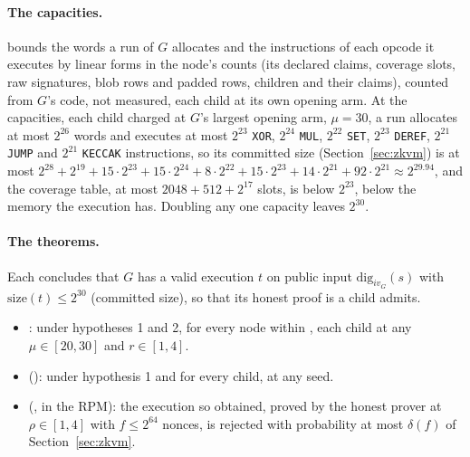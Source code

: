 \documentclass[11pt]{article}
\begin{document}
\paragraph{The capacities.}  bounds the words a run of $G$ allocates and the instructions of each opcode it executes by linear forms in the node's counts (its declared claims, coverage slots, raw signatures, blob rows and padded rows, children and their claims), counted from $G$'s code, not measured, each child at its own opening arm. At the capacities, each child charged at $G$'s largest opening arm, $\mu = 30$, a run allocates at most $2^{26}$ words and executes at most $2^{23}$ \texttt{XOR}, $2^{24}$ \texttt{MUL}, $2^{22}$ \texttt{SET}, $2^{23}$ \texttt{DEREF}, $2^{21}$ \texttt{JUMP} and $2^{21}$ \texttt{KECCAK} instructions, so its committed size (Section~\ref{sec:zkvm}) is at most $2^{28} + 2^{19} + 15 \cdot 2^{23} + 15 \cdot 2^{24} + 8 \cdot 2^{22} + 15 \cdot 2^{23} + 14 \cdot 2^{21} + 92 \cdot 2^{21} \approx 2^{29.94}$, and the coverage table, at most $2048 + 512 + 2^{17}$ slots, is below $2^{23}$, below the memory the execution has. Doubling any one capacity leaves $2^{30}$.

\paragraph{The theorems.} Each concludes that $G$ has a valid execution $t$ on public input
$\mathrm{dig}_{iv_G}(s)$ with $\mathrm{size}(t) \le 2^{30}$ (committed size), so that its honest
proof is a child  admits.
\begin{itemize}
\item {}: under hypotheses 1 and 2, for every node within , each child at any $\mu \in [20,30]$ and $r \in [1,4]$.
\item {} (): under hypothesis 1 and  for every child, at any seed.
\item {} (, in the RPM): the execution so obtained,
proved by the honest prover at $\rho \in [1,4]$ with $f \le 2^{64}$ nonces, is rejected with
probability at most $\delta(f)$ of Section~\ref{sec:zkvm}.
\end{itemize}
\end{document}
